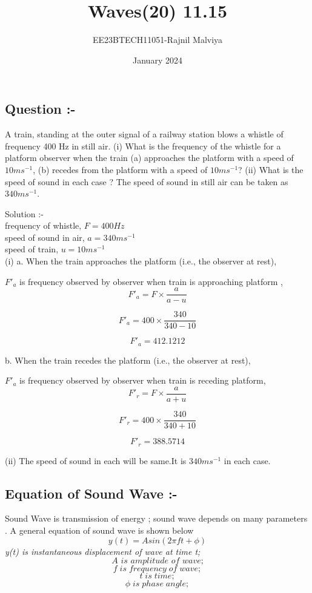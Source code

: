 \documentclass[journal,12pt,twocolumn]{IEEEtran}
\theoremstyle{remark}
\begin{document}
\title{Waves(20) 11.15}
\author{EE23BTECH11051-Rajnil Malviya}
\date{January 2024}



\maketitle

\subsection*{\textbf{Question :-}}
A train, standing at the outer signal of a railway station blows a whistle of frequency
400 Hz in still air. (i) What is the frequency of the whistle for a platform observer
when the train (a) approaches the platform with a speed of $10 ms^{-1} $, (b) recedes
from the platform with a speed of $10 ms^{-1} $? (ii) What is the speed of sound in each
case ? The speed of sound in still air can be taken as $340 ms^{-1} $.

\bigskip
Solution :-\\
           frequency of whistle, $F = 400 Hz$\\
speed of sound in air, $a= 340  ms^{-1} $\\
speed of train, $u= 10 ms^{-1} $\\

(i)  a. When the train approaches the platform (i.e., the observer at rest),
\bigskip

$F'_a $ is frequency observed by observer when train is approaching platform ,\\

$$F'_a=F\times\frac{a}{a-u}$$

$$F'_a=400\times\frac{340}{340-10}$$

$$F'_a=412.1212$$
\bigskip

b. When the train recedes the platform (i.e., the observer at rest),
\bigskip

$F'_a $ is frequency observed by observer when train is receding platform,\\
$$F'_r=F\times\frac{a}{a+u}$$

$$F'_r=400\times\frac{340}{340+10}$$

$$F'_r=388.5714$$
\bigskip

(ii) The speed of sound in each will be same.It is $340  ms^{-1}$ in each case.\\

\bigskip

\subsection*{\textbf{Equation of Sound Wave :-}}
Sound Wave is transmission of energy ; sound wave depends on many parameters . A general equation of sound wave is shown below 
$$y(t) = Asin( 2 \pi ft + \phi ) $$  
\textit{y(t) is instantaneous 
displacement of wave at time t;}$$\textit{A is amplitude of wave;}$$$$f\;is\; frequency\; of\; wave;$$
$$t \;is\; time;$$$$\phi \; is \; phase \; angle;$$
\bigskip
\end{document}
